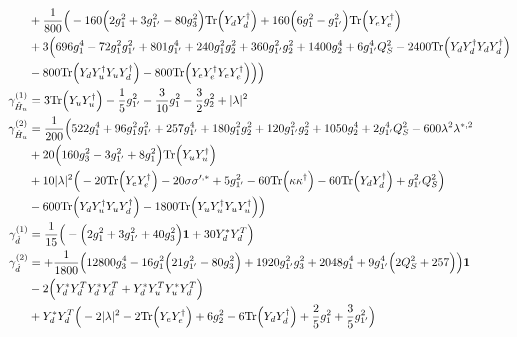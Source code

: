 {\begin{align}
 &+\frac{1}{800} \Big(-160 \Big(2 g_{1}^{2}  + 3 g_{1'}^{2}  -80 g_{3}^{2} \Big)\mbox{Tr}\Big({Y_d  Y_{d}^{\dagger}}\Big) +160 \Big(6 g_{1}^{2}  - g_{1'}^{2} \Big)\mbox{Tr}\Big({Y_e  Y_{e}^{\dagger}}\Big) \nonumber \\ 
 &+3 \Big(696 g_{1}^{4} -72 g_{1}^{2} g_{1'}^{2} +801 g_{1'}^{4} +240 g_{1}^{2} g_{2}^{2} +360 g_{1'}^{2} g_{2}^{2} +1400 g_{2}^{4} +6 g_{1'}^{4} Q_{S}^{2} -2400 \mbox{Tr}\Big({Y_d  Y_{d}^{\dagger}  Y_d  Y_{d}^{\dagger}}\Big) \nonumber \\ 
 &-800 \mbox{Tr}\Big({Y_d  Y_{u}^{\dagger}  Y_u  Y_{d}^{\dagger}}\Big) -800 \mbox{Tr}\Big({Y_e  Y_{e}^{\dagger}  Y_e  Y_{e}^{\dagger}}\Big) \Big)\Big)\\ 
\gamma_{\hat{H}_u}^{(1)} & =  
3 \mbox{Tr}\Big({Y_u  Y_{u}^{\dagger}}\Big)  -\frac{1}{5} g_{1'}^{2}  -\frac{3}{10} g_{1}^{2}  -\frac{3}{2} g_{2}^{2}  + |\lambda|^2\\ 
\gamma_{\hat{H}_u}^{(2)} & =  
\frac{1}{200} \Big(522 g_{1}^{4} +96 g_{1}^{2} g_{1'}^{2} +257 g_{1'}^{4} +180 g_{1}^{2} g_{2}^{2} +120 g_{1'}^{2} g_{2}^{2} +1050 g_{2}^{4} +2 g_{1'}^{4} Q_{S}^{2} -600 \lambda^{2} \lambda^{*,2} \nonumber \\ 
 &+20 \Big(160 g_{3}^{2}  -3 g_{1'}^{2}  + 8 g_{1}^{2} \Big)\mbox{Tr}\Big({Y_u  Y_{u}^{\dagger}}\Big) \nonumber \\ 
 &+10 |\lambda|^2 \Big(-20 \mbox{Tr}\Big({Y_e  Y_{e}^{\dagger}}\Big)  -20 \sigma \sigma^{\prime,*}  + 5 g_{1'}^{2}  -60 \mbox{Tr}\Big({\kappa  \kappa^{\dagger}}\Big)  -60 \mbox{Tr}\Big({Y_d  Y_{d}^{\dagger}}\Big)  + g_{1'}^{2} Q_{S}^{2} \Big)\nonumber \\ 
 &-600 \mbox{Tr}\Big({Y_d  Y_{u}^{\dagger}  Y_u  Y_{d}^{\dagger}}\Big) -1800 \mbox{Tr}\Big({Y_u  Y_{u}^{\dagger}  Y_u  Y_{u}^{\dagger}}\Big) \Big)\\ 
\gamma_{\hat{d}}^{(1)} & =  
\frac{1}{15} \Big(- \Big(2 g_{1}^{2}  + 3 g_{1'}^{2}  + 40 g_{3}^{2} \Big){\bf 1}  + 30 {Y_d^*  Y_{d}^{T}} \Big)\\ 
\gamma_{\hat{d}}^{(2)} & =  
+\frac{1}{1800} \Big(12800 g_{3}^{4}  -16 g_{1}^{2} \Big(21 g_{1'}^{2}  -80 g_{3}^{2} \Big) + 1920 g_{1'}^{2} g_{3}^{2}  + 2048 g_{1}^{4}  + 9 g_{1'}^{4} \Big(2 Q_{S}^{2}  + 257\Big)\Big){\bf 1} \nonumber \\ 
 &-2 \Big({Y_d^*  Y_{d}^{T}  Y_d^*  Y_{d}^{T}} + {Y_d^*  Y_{u}^{T}  Y_u^*  Y_{d}^{T}}\Big)\nonumber \\ 
 &+{Y_d^*  Y_{d}^{T}} \Big(-2 |\lambda|^2  -2 \mbox{Tr}\Big({Y_e  Y_{e}^{\dagger}}\Big)  + 6 g_{2}^{2}  -6 \mbox{Tr}\Big({Y_d  Y_{d}^{\dagger}}\Big)  + \frac{2}{5} g_{1}^{2}  + \frac{3}{5} g_{1'}^{2} \Big)\\ 

\end{align}}
